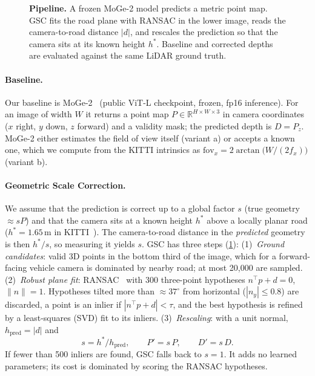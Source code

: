 \documentclass[10pt,twocolumn,letterpaper]{article}
\begin{document}
\begin{figure}[t]
{}
\vspace{-1.5em}
\caption{\textbf{Pipeline.} A frozen MoGe-2 model predicts a metric point map. GSC fits the road plane
with RANSAC in the lower image, reads the camera-to-road distance $|d|$, and rescales the prediction so
that the camera sits at its known height $h^{*}$. Baseline and corrected depths are evaluated against
the same LiDAR ground truth.}
\label{fig:pipeline}
\end{figure}

\paragraph{Baseline.}
Our baseline is MoGe-2~\cite{wang2025moge2} (public ViT-L checkpoint, frozen, fp16 inference). For an
image of width $W$ it returns a point map $P \in \mathbb{R}^{H\times W\times 3}$ in camera coordinates
($x$ right, $y$ down, $z$ forward) and a validity mask; the predicted depth is $D = P_z$. MoGe-2
either estimates the field of view itself (variant a) or accepts a known one, which we compute from
the KITTI intrinsics as $\mathrm{fov}_x = 2\arctan\big(W/(2f_x)\big)$ (variant b).

\paragraph{Geometric Scale Correction.}
We assume that the prediction is correct up to a global factor $s$ (true geometry $\approx sP$) and
that the camera sits at a known height $h^{*}$ above a locally planar road ($h^{*}=1.65$\,m in
KITTI~\cite{geiger2012kitti}). The camera-to-road distance in the \emph{predicted} geometry is then
$h^{*}/s$, so measuring it yields $s$. GSC has three steps (\cref{fig:pipeline}):
(1)~\emph{Ground candidates}: valid 3D points in the bottom third of the image, which for a
forward-facing vehicle camera is dominated by nearby road; at most 20{,}000 are sampled.
(2)~\emph{Robust plane fit}: RANSAC~\cite{fischler1981ransac} with 300 three-point hypotheses
$n^\top p + d = 0$, $\lVert n\rVert=1$. Hypotheses tilted more than ${\approx}37^\circ$ from
horizontal ($|n_y| \le 0.8$) are discarded, a point is an inlier if $|n^\top p + d| < \tau$, and the
best hypothesis is refined by a least-squares (SVD) fit to its inliers.
(3)~\emph{Rescaling}: with a unit normal, $h_{\text{pred}} = |d|$ and
\begin{equation}
  s = h^{*}/h_{\text{pred}}, \qquad P' = s\,P, \qquad D' = s\,D .
  \label{eq:scale}
\end{equation}
If fewer than 500 inliers are found, GSC falls back to $s=1$. It adds no learned parameters; its cost
is dominated by scoring the RANSAC hypotheses.
\end{document}
